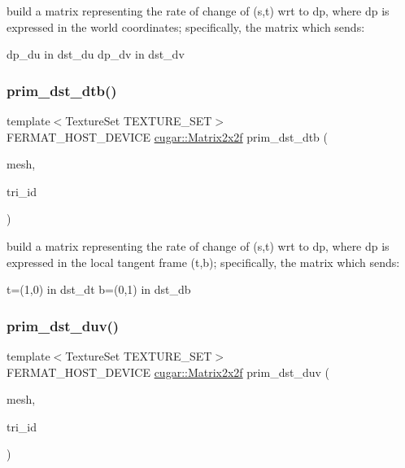 build a matrix representing the rate of change of (s,t) wrt to dp, where dp is expressed in the world coordinates; specifically, the matrix which sends\+:

dp\+\_\+du in dst\+\_\+du dp\+\_\+dv in dst\+\_\+dv \mbox{\label{group___mesh_module_gabdd7256342c1bcd89f9d790432243a3c}} 
\subsubsection{\texorpdfstring{prim\+\_\+dst\+\_\+dtb()}{prim\_dst\_dtb()}}
{\footnotesize\ttfamily template$<$Texture\+Set T\+E\+X\+T\+U\+R\+E\+\_\+\+S\+ET$>$ \\
F\+E\+R\+M\+A\+T\+\_\+\+H\+O\+S\+T\+\_\+\+D\+E\+V\+I\+CE \hyperlink{structcugar_1_1_matrix}{cugar\+::\+Matrix2x2f} prim\+\_\+dst\+\_\+dtb (\begin{DoxyParamCaption}\item[{const \hyperlink{struct_mesh_view}{Mesh\+View} \&}]{mesh,  }\item[{const uint32}]{tri\+\_\+id }\end{DoxyParamCaption})\hspace{0.3cm}{\ttfamily [inline]}}

build a matrix representing the rate of change of (s,t) wrt to dp, where dp is expressed in the local tangent frame (t,b); specifically, the matrix which sends\+:

t=(1,0) in dst\+\_\+dt b=(0,1) in dst\+\_\+db \mbox{\label{group___mesh_module_gae02af2f5ef03be32fc7743d596f34ae9}} 
\subsubsection{\texorpdfstring{prim\+\_\+dst\+\_\+duv()}{prim\_dst\_duv()}}
{\footnotesize\ttfamily template$<$Texture\+Set T\+E\+X\+T\+U\+R\+E\+\_\+\+S\+ET$>$ \\
F\+E\+R\+M\+A\+T\+\_\+\+H\+O\+S\+T\+\_\+\+D\+E\+V\+I\+CE \hyperlink{structcugar_1_1_matrix}{cugar\+::\+Matrix2x2f} prim\+\_\+dst\+\_\+duv (\begin{DoxyParamCaption}\item[{const \hyperlink{struct_mesh_view}{Mesh\+View} \&}]{mesh,  }\item[{const uint32}]{tri\+\_\+id }\end{DoxyParamCaption})\hspace{0.3cm}{\ttfamily [inline]}}

